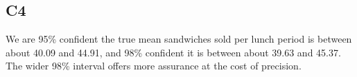 \begin{ExamProblems}
		\subsection*{C4}
		We are 95\% confident the true mean sandwiches sold per lunch period is between about 40.09 and 44.91, and 98\% confident it is between about 39.63 and 45.37. The wider 98\% interval offers more assurance at the cost of precision.
	\end{ExamProblems}

